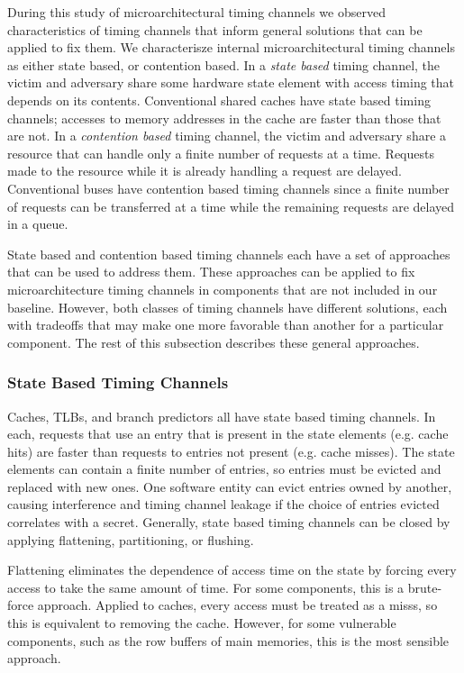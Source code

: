 During this study of microarchitectural timing channels we observed 
characteristics of timing channels that inform general solutions that can be 
applied to fix them.
We characterisze internal microarchitectural timing channels as either state 
based, or contention based. In a \emph{state based} timing channel, the victim 
and adversary share some hardware state element with access timing that depends 
on its contents. Conventional shared caches have state based timing channels; 
accesses to memory addresses in the cache are faster than those that are not.
In a \emph{contention based} timing channel, the victim and adversary share a 
resource that can handle only a finite number of requests at a time.  Requests 
made to the resource while it is already handling a request are delayed.  
Conventional buses have contention based timing channels since a finite number 
of requests can be transferred at a time while the remaining requests are 
delayed in a queue.

State based and contention based timing channels each have a set of approaches 
that can be used to address them. These approaches can be applied to fix
microarchitecture timing channels in components that are not included in our 
baseline. However, both classes of timing channels have different solutions, 
each with tradeoffs that may make one more favorable than another for a 
particular component. The rest of this subsection describes these general 
approaches.

\subsubsection{State Based Timing Channels}
Caches, TLBs, and branch predictors all have state based timing channels. In 
each, requests that use an entry that is present in the state elements (e.g.  
cache hits) are faster than requests to entries not present (e.g. cache 
misses). The state elements can contain a finite number of entries, so entries 
must be evicted and replaced with new ones. One software entity can evict 
entries owned by another, causing interference and timing channel leakage if 
the choice of entries evicted correlates with a secret. Generally, state based 
timing channels can be closed by applying flattening, partitioning, or 
flushing.

Flattening eliminates the dependence of access time on the state by forcing 
every access to take the same amount of time. For some components, this is a 
brute-force approach. Applied to caches, every access must be treated as a 
misss, so this is equivalent to removing the cache. However, for some 
vulnerable components, such as the row buffers of main memories, this is the 
most sensible approach.

